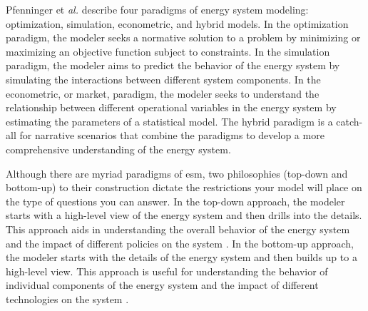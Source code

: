 Pfenninger et \textit{al.} \cite{pfenninger_energy_2014} describe four
paradigms of energy system modeling: optimization, simulation, econometric, and
hybrid models. In the optimization paradigm, the modeler seeks a normative
solution to a problem by minimizing or maximizing an objective function subject
to constraints. In the simulation paradigm, the modeler aims to predict the
behavior of the energy system by simulating the interactions between different
system components. In the econometric, or market, paradigm, the modeler seeks
to understand the relationship between different operational variables in the
energy system by estimating the parameters of a statistical model. The hybrid
paradigm is a catch-all for narrative scenarios that combine the paradigms to
develop a more comprehensive understanding of the energy system.

Although there are myriad paradigms of \gls{esm}, two philosophies (top-down
and bottom-up) to their construction dictate the restrictions your model will
place on the type of questions you can answer. In the top-down approach, the
modeler starts with a high-level view of the energy system and then drills into
the details. This approach aids in understanding the overall behavior of the
energy system and the impact of different policies on the system
\cite{laha_energy_2017}. In the bottom-up approach, the modeler starts with the
details of the energy system and then builds up to a high-level view. This
approach is useful for understanding the behavior of individual components of
the energy system and the impact of different technologies on the system
\cite{ipcc_ch2_2000,laha_energy_2017}.